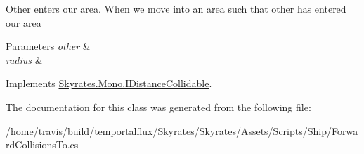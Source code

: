 Other enters our area. When we move into an area such that other has entered our area 


\begin{DoxyParams}{Parameters}
{\em other} & \\
\hline
{\em radius} & \\
\hline
\end{DoxyParams}


Implements \hyperlink{interface_skyrates_1_1_mono_1_1_i_distance_collidable_ab14aebc6f6831e744190428d8d712294}{Skyrates.\-Mono.\-I\-Distance\-Collidable}.



The documentation for this class was generated from the following file\-:\begin{DoxyCompactItemize}
\item 
/home/travis/build/temportalflux/\-Skyrates/\-Skyrates/\-Assets/\-Scripts/\-Ship/Forward\-Collisions\-To.\-cs\end{DoxyCompactItemize}
